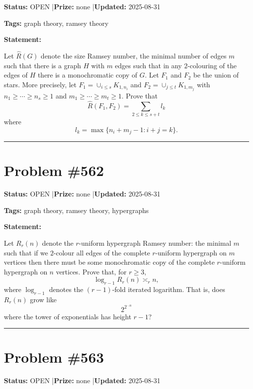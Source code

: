 \documentclass{article}
\begin{document}
\noindent\textbf{Status:} OPEN \quad|\quad \textbf{Prize:} none \quad|\quad \textbf{Updated:} 2025-08-31

\noindent\textbf{Tags:} graph theory, ramsey theory

\medskip

\noindent\textbf{Statement:}

Let $\hat{R}(G)$ denote the size Ramsey number, the minimal number of edges $m$ such that there is a graph $H$ with $m$ edges such that in any $2$-colouring of the edges of $H$ there is a monochromatic copy of $G$. Let $F_1$ and $F_2$ be the union of stars. More precisely, let $F_1=\cup_{i\leq s} K_{1,n_i}$ and $F_2=\cup_{j\leq t} K_{1,m_j}$ with $n_1\geq \cdots \geq n_s\geq 1$ and $m_1\geq \cdots \geq m_t\geq 1$. Prove that\[\hat{R}(F_1,F_2) = \sum_{2\leq k\leq s+t}l_k\]where\[l_k=\max\{n_i+m_j-1 : i+j=k\}.\]

\noindent\rule{\linewidth}{0.4pt}


\section{Problem \#562}
\label{prob:562}

\noindent\textbf{Status:} OPEN \quad|\quad \textbf{Prize:} none \quad|\quad \textbf{Updated:} 2025-08-31

\noindent\textbf{Tags:} graph theory, ramsey theory, hypergraphs

\medskip

\noindent\textbf{Statement:}

Let $R_r(n)$ denote the $r$-uniform hypergraph Ramsey number: the minimal $m$ such that if we $2$-colour all edges of the complete $r$-uniform hypergraph on $m$ vertices then there must be some monochromatic copy of the complete $r$-uniform hypergraph on $n$ vertices. Prove that, for $r\geq 3$,\[\log_{r-1} R_r(n) \asymp_r n,\]where $\log_{r-1}$ denotes the $(r-1)$-fold iterated logarithm. That is, does $R_r(n)$ grow like\[2^{2^{\cdots n}}\]where the tower of exponentials has height $r-1$?

\noindent\rule{\linewidth}{0.4pt}


\section{Problem \#563}
\label{prob:563}

\noindent\textbf{Status:} OPEN \quad|\quad \textbf{Prize:} none \quad|\quad \textbf{Updated:} 2025-08-31
\end{document}
